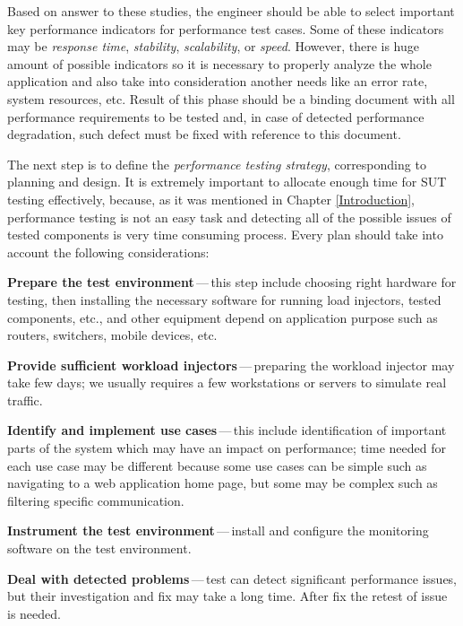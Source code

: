 Based on answer to these studies, the engineer should be able to select important key performance indicators for performance test cases. Some of these indicators may be \emph{response time}, \emph{stability}, \emph{scalability}, or \emph{speed}. However, there is huge amount of possible indicators so it is necessary to properly analyze the whole application and also take into consideration another needs like an error rate, system resources, etc.  Result of this phase should be a binding document with all performance requirements to be tested and, in case of detected performance degradation, such defect must be fixed with reference to this document.

The next step is to define the \emph{performance testing strategy}, corresponding to planning and design. It is extremely important to allocate enough time for SUT testing effectively, because, as it was mentioned in Chapter \ref{Introduction}, performance testing is not an easy task and detecting all of the possible issues of tested components is very time consuming process. Every plan should take into account the following considerations:

\begin{description}
	\setlength\itemsep{0em}
	\item \textbf{Prepare the test environment}\,---\,this step include choosing right hardware for testing, then installing the necessary software for running load injectors, tested components, etc., and other equipment depend on application purpose such as routers, switchers, mobile devices, etc.
	\item \textbf{Provide sufficient workload injectors}\,---\,preparing the workload injector may take few days; we usually requires a few workstations or servers to simulate real traffic.
	\item \textbf{Identify and implement use cases}\,---\,this include identification of important parts of the system which may have an impact on performance; time needed for each use case may be different because some use cases can be simple such as navigating to a web application home page, but some may be complex such as filtering specific communication.
	\item \textbf{Instrument the test environment}\,---\,install and configure the monitoring software on the test environment.
	\item \textbf{Deal with detected problems}\,---\,test can detect significant performance issues, but their investigation and fix may take a long time. After fix the retest of issue is needed.
\end{description}

